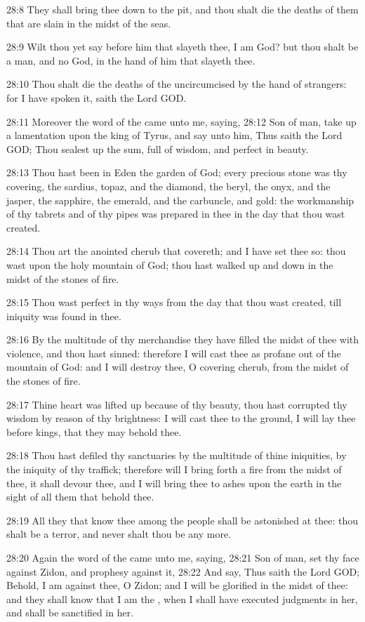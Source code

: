 28:8 They shall bring thee down to the pit, and thou shalt die the
deaths of them that are slain in the midst of the seas.

28:9 Wilt thou yet say before him that slayeth thee, I am God? but
thou shalt be a man, and no God, in the hand of him that slayeth thee.

28:10 Thou shalt die the deaths of the uncircumcised by the hand of
strangers: for I have spoken it, saith the Lord GOD.

28:11 Moreover the word of the \LORD came unto me, saying, 28:12 Son of
man, take up a lamentation upon the king of Tyrus, and say unto him,
Thus saith the Lord GOD; Thou sealest up the sum, full of wisdom, and
perfect in beauty.

28:13 Thou hast been in Eden the garden of God; every precious stone
was thy covering, the sardius, topaz, and the diamond, the beryl, the
onyx, and the jasper, the sapphire, the emerald, and the carbuncle,
and gold: the workmanship of thy tabrets and of thy pipes was prepared
in thee in the day that thou wast created.

28:14 Thou art the anointed cherub that covereth; and I have set thee
so: thou wast upon the holy mountain of God; thou hast walked up and
down in the midst of the stones of fire.

28:15 Thou wast perfect in thy ways from the day that thou wast
created, till iniquity was found in thee.

28:16 By the multitude of thy merchandise they have filled the midst
of thee with violence, and thou hast sinned: therefore I will cast
thee as profane out of the mountain of God: and I will destroy thee, O
covering cherub, from the midst of the stones of fire.

28:17 Thine heart was lifted up because of thy beauty, thou hast
corrupted thy wisdom by reason of thy brightness: I will cast thee to
the ground, I will lay thee before kings, that they may behold thee.

28:18 Thou hast defiled thy sanctuaries by the multitude of thine
iniquities, by the iniquity of thy traffick; therefore will I bring
forth a fire from the midst of thee, it shall devour thee, and I will
bring thee to ashes upon the earth in the sight of all them that
behold thee.

28:19 All they that know thee among the people shall be astonished at
thee: thou shalt be a terror, and never shalt thou be any more.

28:20 Again the word of the \LORD came unto me, saying, 28:21 Son of
man, set thy face against Zidon, and prophesy against it, 28:22 And
say, Thus saith the Lord GOD; Behold, I am against thee, O Zidon; and
I will be glorified in the midst of thee: and they shall know that I
am the \LORD, when I shall have executed judgments in her, and shall be
sanctified in her.

